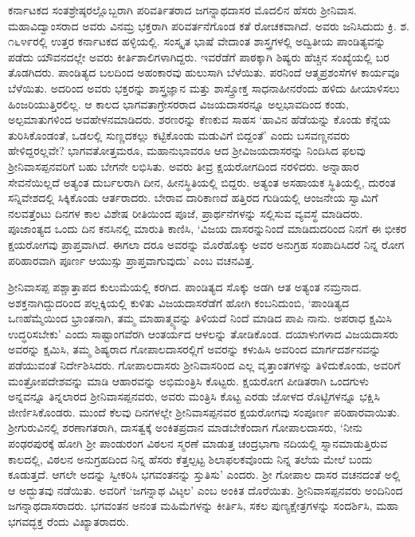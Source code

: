 ಕರ್ನಾಟಕದ ಸಂತಶ್ರೇಷ್ಠರಲ್ಲೊಬ್ಬರಾಗಿ ಪರಿವರ್ತಿತರಾದ ಜಗನ್ನಾಥದಾಸರ ಮೊದಲಿನ ಹೆಸರು ಶ‍್ರೀನಿವಾಸ. ಮಹಾವಿದ್ವಾಂಸರಾದ ಅವರು ವಿನಮ್ರ ಭಕ್ತರಾಗಿ ಪರಿವರ್ತನೆಗೊಂಡ ಕತೆ ರೋಚಕವಾಗಿದೆ. ಅವರು ಜನಿಸಿದುದು ಕ್ರಿ. ಶ. ೧೬೪೯ರಲ್ಲಿ ಉತ್ತರ ಕರ್ನಾಟಕದ ಹಳ್ಳಿಯಲ್ಲಿ. ಸಂಸ್ಕೃತ ಭಾಷೆ ವೇದಾಂತ ಶಾಸ್ತ್ರಗಳಲ್ಲಿ ಅದ್ವಿತೀಯ ಪಾಂಡಿತ್ಯವನ್ನು ಪಡೆದು ಯೌವನದಲ್ಲೇ ಅವರು ಕೀರ್ತಿಶಾಲಿಗಳಾಗಿದ್ದರು. ಇವರೆಡೆಗೆ ಪಾಠಕ್ಕಾಗಿ ಶಿಷ್ಯರು ಹೆಚ್ಚಿನ ಸಂಖ್ಯೆಯಲ್ಲಿ ಬರ ತೊಡಗಿದರು. ಪಾಂಡಿತ್ಯದ ಬಲದಿಂದ ಅಹಂಕಾರವು ಹುಲುಸಾಗಿ ಬೆಳೆಯಿತು. ಪರನಿಂದೆ ಆತ್ಮಪ್ರಶಂಸೆಗಳ ಕಾರ್ಯವೂ ಬೆಳೆಯಿತು. ಅದರಿಂದ ಅವರು ಭಕ್ತರನ್ನು ಶಾಸ್ತ್ರಜ್ಞಾನ ಮತ್ತು ಶಾಸ್ತ್ರೋಕ್ತ ಸಾಧನಾಹೀನರೆಂದು ಹಳಿದು ಹೀಯಾಳಿಸಲು ಹಿಂಜರಿಯುತ್ತಿರಲಿಲ್ಲ. ಆ ಕಾಲದ ಭಾಗವತಾಗ್ರೇಸರರಾದ ವಿಜಯದಾಸರನ್ನೂ ಅಲ್ಪಭಾವದಿಂದ ಕಂಡು, ಅಲ್ಪಮಾತುಗಳಿಂದ ಅವಹೇಳನಮಾಡಿದರು. ಶರಣರನ್ನು ಕೆಣಕುವ ಸಾಹಸ ‘ಹಾವಿನ ಹೆಡೆಯನ್ನು ಕೊಂಡು ಕೆನ್ನೆಯ ತುರಿಸಿಕೊಂಡಂತೆ, ಒಡಲಲ್ಲಿ ಸುಣ್ಣದಕಲ್ಲು ಕಟ್ಟಿಕೊಂಡು ಮಡುವಿಗೆ ಬಿದ್ದಂತೆ’ ಎಂದು ಬಸವಣ್ಣನವರು ಹೇಳಿದ್ದರಲ್ಲವೇ? ಭಾಗವತೋತ್ತಮರೂ, ಮಹಾನುಭಾವರೂ ಆದ ಶ‍್ರೀವಿಜಯದಾಸರನ್ನು ನಿಂದಿಸಿದ ಫಲವು ಶ‍್ರೀನಿವಾಸಪ್ಪನವರಿಗೆ ಬಹು ಬೇಗನೇ ಲಭಿಸಿತು. ಅವರು ತೀವ್ರ ಕ್ಷಯರೋಗದಿಂದ ನರಳಿದರು. ಅನ್ನಾಹಾರ ಸೇವನೆಯಿಲ್ಲದೆ ಅತ್ಯಂತ ದುರ್ಬಲರಾಗಿ ದೀನ, ಹೀನಸ್ಥಿತಿಯಲ್ಲಿ ಬಿದ್ದರು. ಅತ್ಯಂತ ಅಸಹಾಯಕ ಸ್ಥಿತಿಯಲ್ಲಿ, ದುರಂತ ಸನ್ನಿವೇಶದಲ್ಲಿ ಸಿಕ್ಕಿಕೊಂಡು ಆರ್ತರಾದರು. ಬೇರಾವ ದಾರಿಕಾಣದೆ ಹತ್ತಿರದ ಗುಡಿಯಲ್ಲಿ ಆಂಜನೇಯ ಸ್ವಾಮಿಗೆ ನಲವತ್ತೆಂಟು ದಿನಗಳ ಕಾಲ ವಿಶೇಷ ರೀತಿಯಿಂದ ಪೂಜೆ, ಪ್ರಾರ್ಥನೆಗಳನ್ನು ಸಲ್ಲಿಸುವ ವ್ಯವಸ್ಥೆ ಮಾಡಿದರು. ಪೂಜಾಂತ್ಯದ ಒಂದು ದಿನ ಕನಸಿನಲ್ಲಿ ಮಾರುತಿ ಕಾಣಿಸಿ, ‘ವಿಜಯ ದಾಸರನ್ನುನಿಂದೆ ಮಾಡಿದುದರಿಂದ ನಿನಗೆ ಈ ಭೀಕರ ಕ್ಷಯರೋಗವು ಪ್ರಾಪ್ತವಾಗಿದೆ. ಈಗಲಾ ದರೂ ಅವರನ್ನು ಮೊರೆಹೊಕ್ಕು ಅವರ ಅನುಗ್ರಹ ಸಂಪಾದಿಸಿದರೆ ನಿನ್ನ ರೋಗ ಪರಿಹಾರವಾಗಿ ಪೂರ್ಣ ಆಯುಸ್ಸು ಪ್ರಾಪ್ತವಾಗುವುದು’ ಎಂಬ ವಚನವಿತ್ತ.

ಶ‍್ರೀನಿವಾಸಪ್ಪ ಪಶ್ಚಾತ್ತಾಪದ ಕುಲುಮೆಯಲ್ಲಿ ಕರಗಿದ. ಪಾಂಡಿತ್ಯದ ಸೊಕ್ಕು ಅಡಗಿ ಆತ ಅತ್ಯಂತ ನಮ್ರನಾದ. ಅಶಕ್ತನಾಗಿದ್ದುದರಿಂದ ಪಲ್ಲಕ್ಕಿಯಲ್ಲಿ ಕುಳಿತು ವಿಜಯದಾಸರೆಡೆಗೆ ಹೋಗಿ ಕಂಬನಿದುಂಬಿ, ‘ಪಾಂಡಿತ್ಯದ ಒಣಹೆಮ್ಮೆಯಿಂದ ಭ್ರಾಂತನಾಗಿ, ತಮ್ಮ ಮಾಹಾತ್ಮ್ಯವನ್ನು ತಿಳಿಯದೆ ನಿಂದೆ ಮಾಡಿದ ಪಾಪಿ ನಾನು. ಅಪರಾಧ ಕ್ಷಮಿಸಿ ಉದ್ಧರಿಸಬೇಕು’ ಎಂದು ಸಾಷ್ಟಾಂಗವೆರಗಿ ಆಂತರ್ಯದ ಆಳಲನ್ನು ತೋಡಿಕೊಂಡ. ದಯಾಳುಗಳಾದ ವಿಜಯದಾಸರು ಅವರನ್ನು ಕ್ಷಮಿಸಿ, ತಮ್ಮ ಶಿಷ್ಯರಾದ ಗೋಪಾಲದಾಸರಲ್ಲಿಗೆ ಅವರನ್ನು ಕಳುಹಿಸಿ ಅವರಿಂದ ಮಾರ್ಗದರ್ಶನವನ್ನು ಪಡೆಯುವಂತೆ ನಿರ್ದೇಶಿಸಿದರು. ಗೋಪಾಲದಾಸರು ಶ‍್ರೀನಿವಾಸರಿಂದ ಎಲ್ಲ ವೃತ್ತಾಂತಗಳನ್ನು ತಿಳಿದುಕೊಂಡು, ಅವರಿಗೆ ಮಂತ್ರೋಪದೇಶವನ್ನು ಮಾಡಿ ಆಹಾರವನ್ನು ಅಭಿಮಂತ್ರಿಸಿ ಕೊಟ್ಟರು. ಕ್ಷಯರೋಗ ಪೀಡಿತರಾಗಿ ಒಂದಗುಳು ಅನ್ನವನ್ನೂ ತಿನ್ನಲಾರದ ಶ‍್ರೀನಿವಾಸಪ್ಪನವರು, ಅವರು ಮಂತ್ರಿಸಿ ಕೊಟ್ಟ ಎರಡು ಜೋಳದ ರೊಟ್ಟಿಗಳನ್ನೂ ಭಕ್ಷಿಸಿ ಜೀರ್ಣಿಸಿಕೊಂಡರು. ಮುಂದೆ ಕೆಲವು ದಿನಗಳಲ್ಲೇ ಶ‍್ರೀನಿವಾಸಪ್ಪನವರ ಕ್ಷಯರೋಗವು ಸಂಪೂರ್ಣ ಪರಿಹಾರವಾಯಿತು. ಶ‍್ರೀಗುರುವಿನಲ್ಲಿ ಶರಣಾಗತರಾಗಿ, ದಾಸತ್ವಕ್ಕೆ ಅಂಕಿತಪ್ರದಾನ ಮಾಡಬೇಕೆಂದಾಗ ಗೋಪಾಲದಾಸರು, ‘ನೀನು ಪಂಢರಪುರಕ್ಕೆ ಹೋಗಿ ಶ‍್ರೀ ಪಾಂಡುರಂಗ ವಿಠಲನ ಸ್ಮರಣೆ ಮಾಡುತ್ತ ಚಂದ್ರಭಾಗಾ ನದಿಯಲ್ಲಿ ಸ್ನಾನಮಾಡುತ್ತಿರುವ ಕಾಲದಲ್ಲಿ, ವಿಠಲನ ಅನುಗ್ರಹದಿಂದ ನಿನ್ನ ಹೆಸರು ಕೆತ್ತಲ್ಪಟ್ಟ ಶಿಲಾಫಲಕವೊಂದು ನಿನ್ನ ತಲೆಯ ಮೇಲೆ ಬಂದು ಕೂಡುತ್ತದೆ. ಆಗಲೇ ಅದನ್ನು ಸ್ವೀಕರಿಸಿ ಭಗವಂತನನ್ನು ಸ್ತುತಿಸು’ ಎಂದರು. ಶ‍್ರೀ ಗೋಪಾಲ ದಾಸರ ವಚನದಂತೆ ಅಲ್ಲಿ ಆ ಅದ್ಭುತವು ನಡೆಯಿತು. ಅವರಿಗೆ ‘ಜಗನ್ನಾಥ ವಿಟ್ಠಲ’ ಎಂಬ ಅಂಕಿತ ದೊರೆಯಿತು. ಶ‍್ರೀನಿವಾಸಪ್ಪನವರು ಅಂದಿನಿಂದ ಜಗನ್ನಾಥದಾಸರಾದರು. ಭಗವಂತನ ಅನಂತ ಮಹಿಮೆಗಳನ್ನು ಕೀರ್ತಿಸಿ, ಸಕಲ ಪುಣ್ಯಕ್ಷೇತ್ರಗಳನ್ನು ಸಂದರ್ಶಿಸಿ, ಮಹಾ ಭಗವದ್ಭಕ್ತ ರೆಂದು ವಿಖ್ಯಾತರಾದರು.

